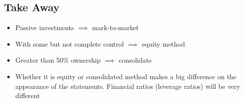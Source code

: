 \subsection*{Take Away}
\begin{itemize}[noitemsep,topsep=0pt]
	\item Passive investments  $\implies$ mark-to-market
	\item With some but not complete control  $\implies$ equity method
	\item Greater than 50\%  ownership $\implies$ consolidate
	\item Whether it is equity or consolidated method makes a big difference on the appearance
	of the statements. Financial ratios (leverage ratios) will be very different
\end{itemize}
